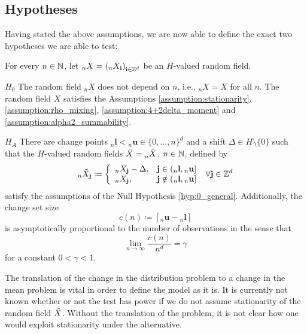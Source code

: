 \subsection{Hypotheses}

Having stated the above assumptions, we are now able to define the exact two hypotheses we are able to test:

For every $n \in \mathbb{N}$, let ${}_{n}X = \left({}_{n}X_\mathbf{i}\right)_{\mathbf{i} \in \mathbb{Z}^d}$ be an $H$-valued random field.
\begin{hyp}{\ensuremath{H_0}} \label{hyp:0_general} 
    The random field ${}_{n}X$ does not depend on $n$, i.e., ${}_{n}X = X$ for all $n$. The random field $X$ satisfies the Assumptions \ref{assumption:stationarity}, \ref{assumption:rho_mixing}, \ref{assumption:4+2delta_moment} and \ref{assumption:alpha2_summability}.
\end{hyp}
\begin{hyp}{\ensuremath{H_A}} \label{hyp:a_general} 
    There are change points ${}_{n}\mathbf{l} < {}_{n}\mathbf{u} \in \{0, ..., n\}^d$ and a shift $\Delta \in H \setminus \{0\}$ such that the $H$-valued random fields $\Tilde{X} = \prescript{}{n}{\Tilde{X}}$, $n \in \mathbb{N}$, defined by 
    \[ {}_{n}\Tilde{X}_\mathbf{j} \coloneqq \left\{
        \begin{array}{ll}
        {}_{n}X_\mathbf{j} - \Delta, & \mathbf{j} \in ({}_{n}\mathbf{l}, {}_{n}\mathbf{u}] \\
        {}_{n}X_\mathbf{j}, & \mathbf{j} \notin ({}_{n}\mathbf{l}, {}_{n}\mathbf{u}] \\
        \end{array}
        \right.  \ \forall \mathbf{j} \in \mathbb{Z}^d \]
    satisfy the assumptions of the Null Hypothesis \ref{hyp:0_general}. Additionally, the change set size
    \[ c(n) \coloneqq [{}_{n}\mathbf{u} - {}_{n}\mathbf{l}] \]
    is asymptotically proportional to the number of observations in the sense that
    \begin{equation} \label{change set size restriction}
        \lim\limits_{n \to \infty} \frac{c(n)}{n^d} = \gamma
    \end{equation}
    for a constant $0 < \gamma < 1$.
\end{hyp}


\begin{remark}
     The translation of the change in the distribution problem to a change in the mean problem is vital in order to define the model as it is. It is currently not known whether or not the test has power if we do not assume stationarity of the random field $\Tilde{X}$. Without the translation of the problem, it is not clear how one would exploit stationarity under the alternative.
\end{remark}

